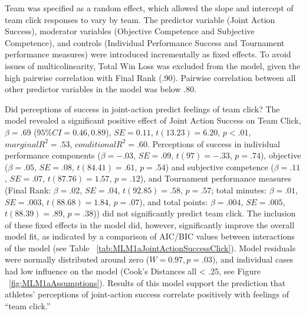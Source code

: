 \documentclass[12pt]{report}
\begin{document}
{Team was specified as a random effect, which allowed the slope and intercept of team click responses to vary by team. The predictor variable (Joint Action Success), moderator variables (Objective Competence and Subjective Competence), and controls (Individual Performance Success and Tournament performance measures) were introduced incrementally as fixed effects. To avoid issues of multicolinearity, Total Win Loss was excluded from the model, given the high pairwise correlation with Final Rank (.90). Pairwise correlation between all other predictor variables in the model was below .80.

Did perceptions of success in joint-action predict feelings of team click?  The model revealed a significant positive effect of Joint Action Success on Team Click, $\beta = .69$ ($95\% CI =  0.46, 0.89$), $SE = 0.11$, $t(13.23) = 6.20$, $p < .01$, $marginal R^2 = .53$, $conditional R^2 = .60$.  Perceptions of success in individual performance components ($\beta = -.03$, $SE = .09$, $t(97) = -.33$, $p = .74$), objective ($\beta = .05$, $SE = .08$, $t(84.41) = .61$, $p = .54$) and subjective competence ($\beta = .11$, $SE = .07$, $t(87.76) = 1.57$, $p = .12$), and Tournament performance measures (Final Rank: $\beta = .02$, $SE = .04$, $t(92.85) = .58$, $p = .57$; total minutes: $\beta = .01$, $SE = .003$, $t(88.68) = 1.84$, $p = .07$), and total points: $\beta = .004$, $SE = .005$, $t(88.39) = .89$, $p = .38$)) did not significantly predict team click.  The inclusion of these fixed effects in the model did, however, significantly improve the overall model fit, as indicated by a comparison of AIC/BIC values between interactions of the model (see Table ~\ref{tab:MLM1aJointActionSuccessClick}).  Model residuals were normally distributed around zero ($W = 0.97, p = .03$), and individual cases had low influence on the model (Cook's Distances all < .25, see Figure ~\ref{fig:MLM1aAssumptions}). Results of this model support the prediction that athletes' perceptions of joint-action success correlate positively with feelings of ``team click.''




}
\end{document}
